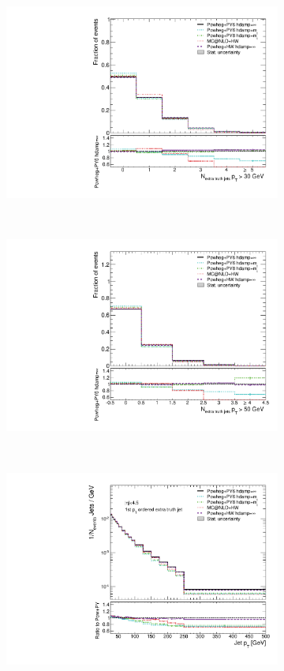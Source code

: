 \begin{figure}
\centering
\begin{subfigure}[]{0.45\textwidth}
\includegraphics[width=\textwidth]{fig/MCComp/NLO/NTruthExtraJets30.pdf}
\end{subfigure}
~
\begin{subfigure}[]{0.45\textwidth}
\includegraphics[width=\textwidth]{fig/MCComp/NLO/NTruthExtraJets50.pdf}
\end{subfigure} \\
\begin{subfigure}[]{0.45\textwidth}
\includegraphics[width=\textwidth]{fig/MCComp/NLO/TruthPtJet0.pdf}

\end{subfigure}
\end{figure}
